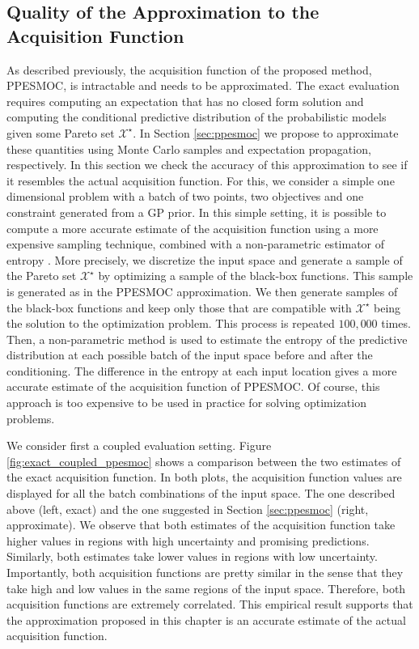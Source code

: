 \subsection{Quality of the Approximation to the Acquisition Function}

As described previously, the acquisition function of the proposed method, PPESMOC, is intractable and needs to be
approximated. The exact evaluation requires computing an expectation that has no closed form solution
and computing the conditional predictive distribution of the probabilistic models given some Pareto set $\mathcal{X}^\star$.
In Section \ref{sec:ppesmoc} we propose to approximate these quantities using Monte Carlo samples and expectation propagation, respectively.
In this section we check the accuracy of this approximation to see if it resembles the actual acquisition function.
For this, we consider a simple one dimensional problem with a batch of two points, two objectives and one constraint generated from a
GP prior. In this simple setting, it is possible to compute a more accurate estimate of the acquisition function
using a more expensive sampling technique, combined with a non-parametric estimator of entropy \citep{singh2003nearest}.
More precisely, we discretize the input space and generate a sample of the Pareto set $\mathcal{X}^\star$ by optimizing
a sample of the black-box functions. This sample is generated as in the PPESMOC approximation. We then generate
samples of the black-box functions and keep only those that are compatible with $\mathcal{X}^\star$ being the
solution to the optimization problem. This process is repeated $100,000$ times. Then, a non-parametric method is used
to estimate the entropy of the predictive distribution at each possible batch of the input space before and after the conditioning.
The difference in the entropy at each input location gives a more accurate estimate of the acquisition function of PPESMOC.
Of course, this approach is too expensive to be used in practice for solving optimization problems.

We consider first a coupled evaluation setting. Figure \ref{fig:exact_coupled_ppesmoc} shows a comparison between the two estimates of the exact acquisition function.
In both plots, the acquisition function values are displayed for all the batch combinations of the input space. 
The one described above (left, exact) and the one suggested in Section \ref{sec:ppesmoc} (right, approximate).
We observe that both estimates of the acquisition function take higher values in regions with high
uncertainty and promising predictions. Similarly, both estimates take lower values in regions with low uncertainty.
Importantly, both acquisition functions are pretty similar in the sense that they take high and low values in the
same regions of the input space. Therefore, both acquisition functions are extremely correlated. This
empirical result supports that the approximation proposed in this chapter is an accurate estimate of the
actual acquisition function.

